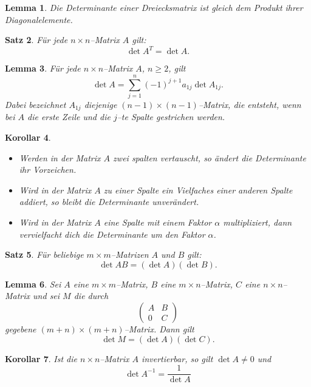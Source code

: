 \documentclass[9pt,fleqn,ngerman,article]{memoir}
\newtheorem{lemma}{Lemma}[section]
\newtheorem{satz}[lemma]{Satz}
\newtheorem{korollar}[lemma]{Korollar}
\begin{document}
\begin{multicols*}{3}
			\begin{lemma}
				Die Determinante einer Dreiecksmatrix ist gleich dem Produkt ihrer Diagonalelemente.
			\end{lemma}
			
			\begin{satz}
				Für jede $n \times n$--Matrix $A$ gilt:
				\[
					\det A^T = \det A.
				\]
			\end{satz}
			
			\begin{lemma}
				Für jede $n \times n$--Matrix $A$, $n \geq 2$, gilt
				\[
					\det A = \sum_{j=1}^n (-1)^{j+1} a_{1j} \det A_{1j}.
				\]
				Dabei bezeichnet $A_{1j}$ diejenige $(n-1) \times (n-1)$--Matrix, die entsteht, wenn bei $A$ die erste Zeile und die $j$--te Spalte gestrichen werden.
			\end{lemma}
			
			\begin{korollar}
				\begin{itemize}
					\item[i)] Werden in der Matrix $A$ zwei spalten vertauscht, so ändert die Determinante ihr Vorzeichen.
					\item[ii)] Wird in der Matrix $A$ zu einer Spalte ein Vielfaches einer anderen Spalte addiert, so bleibt die Determinante unverändert.
					\item[iii)] Wird in der Matrix $A$ eine Spalte mit einem Faktor $\alpha$ multipliziert, dann vervielfacht dich die Determinante um den Faktor $\alpha$.
				\end{itemize}
			\end{korollar}
			
			\begin{satz}
				Für beliebige $m \times m$--Matrizen $A$ und $B$ gilt:
				\[
					\det AB = (\det A)(\det B).
				\]
			\end{satz}
			
			\begin{lemma}
				Sei $A$ eine $m \times m$--Matrix, $B$ eine $m \times n$--Matrix, $C$ eine $n \times n$--Matrix und sei $M$ die durch
				\[
					\left(\begin{array}{rr}
								A&B\\
								0&C
						\end{array}\right)
				\]
				gegebene $(m + n) \times (m + n)$--Matrix. Dann gilt
				\[
					\det M = (\det A)(\det C).
				\]
			\end{lemma}
			
			\begin{korollar}
				Ist die $n \times n$--Matrix $A$ invertierbar, so gilt $\det A \neq 0$ und
				\[
					\det A^{-1} = \frac{1}{\det A}
				\]
			\end{korollar}
			

\end{multicols*}
\end{document}
